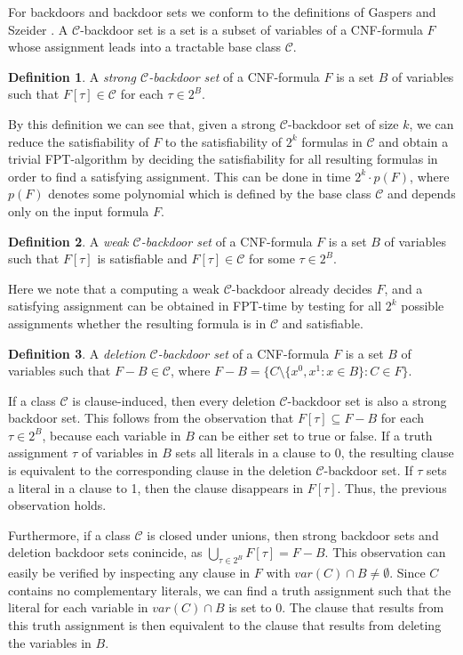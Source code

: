 \documentclass[11pt,a4paper]{article}
\theoremstyle{definition}
\newtheorem{definition}{Definition}[section]
\theoremstyle{proposition}
\begin{document}
For backdoors and backdoor sets we conform to the definitions of Gaspers and Szeider \cite[p.289f]{Gaspers2012}. A $\mathcal{C}$-backdoor set is a set is a subset of variables of a CNF-formula $F$ whose assignment leads into a tractable base class $\mathcal{C}$. 
\begin{definition}
A \textit{strong $\mathcal{C}$-backdoor set} of a CNF-formula $F$ is a set $B$ of variables such that $F[\tau] \in \mathcal{C}$ for each $\tau \in 2^B$. 
\end{definition}
By this definition we can see that, given a strong $\mathcal{C}$-backdoor set of size $k$, we can reduce the satisfiability of $F$ to the satisfiability of $2^k$ formulas in $\mathcal{C}$ and obtain a trivial FPT-algorithm by deciding the satisfiability for all resulting formulas in order to find a satisfying assignment. This can be done in time $2^k \cdot p(F)$, where $p(F)$ denotes some polynomial which is defined by the base class $\mathcal{C}$ and depends only on the input formula $F$. 
\begin{definition}
A \textit{weak $\mathcal{C}$-backdoor set} of a CNF-formula $F$ is a set $B$ of variables such that $F[\tau]$ is satisfiable and $F[\tau] \in \mathcal{C}$ for some $\tau \in 2^B$. 
\end{definition}
Here we note that a computing a weak $\mathcal{C}$-backdoor already decides $F$, and a satisfying assignment can be obtained in FPT-time by testing for all $2^k$ possible assignments whether the resulting formula is in $\mathcal{C}$ and satisfiable.  
\begin{definition}
A \textit{deletion $\mathcal{C}$-backdoor set} of a CNF-formula $F$ is a set $B$ of variables such that $F - B \in \mathcal{C}$, where $F - B = \{C \setminus \{x^0, x^1 \colon x \in B\} \colon C \in F \}$. 
\end{definition}
If a class $\mathcal{C}$ is clause-induced, then every deletion $\mathcal{C}$-backdoor set is also a strong backdoor set. This follows from the observation that $F[\tau] \subseteq F - B$ for each $\tau \in 2^B$, because each variable in $B$ can be either set to true or false. If a truth assignment $\tau$ of variables in $B$ sets all literals in a clause to 0, the resulting clause is equivalent to the corresponding clause in the deletion $\mathcal{C}$-backdoor set. If $\tau$ sets a literal in a clause to 1, then the clause disappears in $F[\tau]$. Thus, the previous observation holds. 

Furthermore, if a class $\mathcal{C}$ is closed under unions, then strong backdoor sets and deletion backdoor sets conincide, as $\bigcup_{\tau \in 2^B} F[\tau] = F - B$. This observation can easily be verified by inspecting any clause in $F$ with $var(C) \cap B \neq \emptyset$. Since $C$ contains no complementary literals, we can find a truth assignment such that the literal for each variable in $var(C) \cap B$ is set to 0. The clause that results from this truth assignment is then equivalent to the clause that results from deleting the variables in $B$. 
\end{document}
